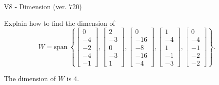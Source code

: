 \begin{exercise}
  \begin{exerciseTitle}V8 - Dimension (ver. 720)\end{exerciseTitle}
  \begin{exerciseStatement}
    Explain how to find the dimension of 
\[W=\mathrm{span}\ \left\{\left[\begin{array}{r}
0 \\
-4 \\
-2 \\
-4 \\
-1
\end{array}\right] , \left[\begin{array}{r}
2 \\
-3 \\
0 \\
-3 \\
1
\end{array}\right] , \left[\begin{array}{r}
0 \\
-16 \\
-8 \\
-16 \\
-4
\end{array}\right] , \left[\begin{array}{r}
1 \\
-4 \\
1 \\
-1 \\
-3
\end{array}\right] , \left[\begin{array}{r}
0 \\
-4 \\
-1 \\
-2 \\
-2
\end{array}\right]\right\}.\]



  \end{exerciseStatement}
  \begin{exerciseAnswer}
   The dimension of \(W\) is  \(4\).
  


  \end{exerciseAnswer}
\end{exercise}